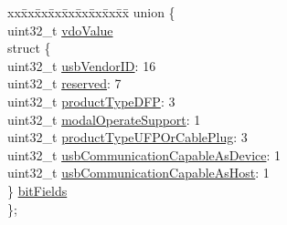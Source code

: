 \begin{DoxyCompactItemize}
\begin{tabbing}
\end{tabbing}\item 
\begin{tabbing}
xx\=xx\=xx\=xx\=xx\=xx\=xx\=xx\=xx\=\kill
union \{\\
\>uint32\_t \hyperlink{struct__pd__id__heaer__vdo_ab1f86734d25b3b0135b97b567dbbf827}{vdoValue}\\
\>struct \{\\
\>\>uint32\_t \hyperlink{struct__pd__id__heaer__vdo_ac60e1351de454f4102ab80718eed2c67}{usbVendorID}: 16\\
\>\>uint32\_t \hyperlink{struct__pd__id__heaer__vdo_a43740bc954203ec44d1ca7bd2855b6c3}{reserved}: 7\\
\>\>uint32\_t \hyperlink{struct__pd__id__heaer__vdo_aef462ffc653ad2c2633fd6bff1eadb0a}{productTypeDFP}: 3\\
\>\>uint32\_t \hyperlink{struct__pd__id__heaer__vdo_a05bbc0945df5f73e31fd61813c47333d}{modalOperateSupport}: 1\\
\>\>uint32\_t \hyperlink{struct__pd__id__heaer__vdo_a20e16d999c9ca067508530a798a97700}{productTypeUFPOrCablePlug}: 3\\
\>\>uint32\_t \hyperlink{struct__pd__id__heaer__vdo_ad331325dfcf70a48ea3511868148af2f}{usbCommunicationCapableAsDevice}: 1\\
\>\>uint32\_t \hyperlink{struct__pd__id__heaer__vdo_a205f468c3e9ddb3895ffcf9b94ab3659}{usbCommunicationCapableAsHost}: 1\\
\>\} \hyperlink{struct__pd__id__heaer__vdo_abf5c2260b3c1b545ed4c11eb61444c24}{bitFields}\\
\}; \\

\end{tabbing}\end{DoxyCompactItemize}


